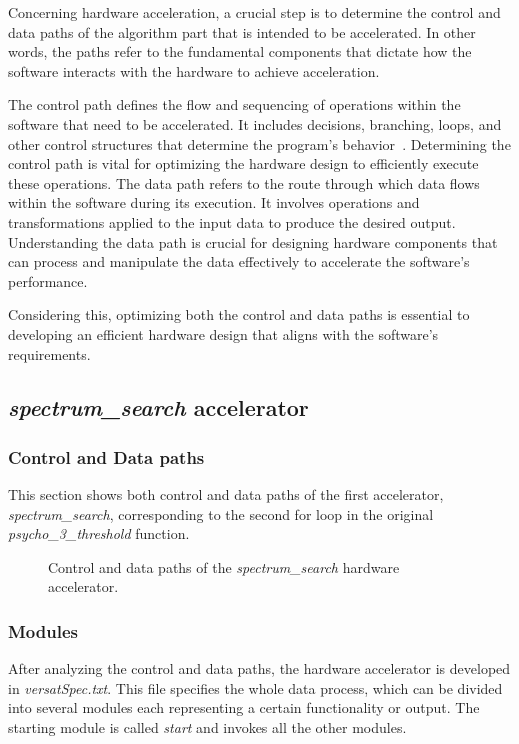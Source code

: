 \vspace{0.5cm}

Concerning hardware acceleration, a crucial step is to determine the control and data paths of the algorithm part that is intended to be accelerated. In other words, the paths refer to the fundamental components that dictate how the software interacts with the hardware to achieve acceleration.

The control path defines the flow and sequencing of operations within the software that need to be accelerated. It includes decisions, branching, loops, and other control structures that determine the program's behavior~\cite{datacontrolpath}. Determining the control path is vital for optimizing the hardware design to efficiently execute these operations.
The data path refers to the route through which data flows within the software during its execution. It involves operations and transformations applied to the input data to produce the desired output. Understanding the data path is crucial for designing hardware components that can process and manipulate the data effectively to accelerate the software's performance.

Considering this, optimizing both the control and data paths is essential to developing an efficient hardware design that aligns with the software's requirements.

\subsection{\textit{spectrum\_search} accelerator}

\subsubsection{Control and Data paths}
This section shows both control and data paths of the first accelerator, \textit{spectrum\_search}, corresponding to the second for loop in the original \textit{psycho\_3\_threshold} function.

\begin{figure}[H]
\centerline{}
\caption{Control and data paths of the \textit{spectrum\_search} hardware accelerator.}
\label{data1}
\end{figure}

\subsubsection{Modules}
After analyzing the control and data paths, the hardware accelerator is developed in \textit{versatSpec.txt}. This file specifies the whole data process, which can be divided into several modules each representing a certain functionality or output. The starting module is called \textit{start} and invokes all the other modules.

